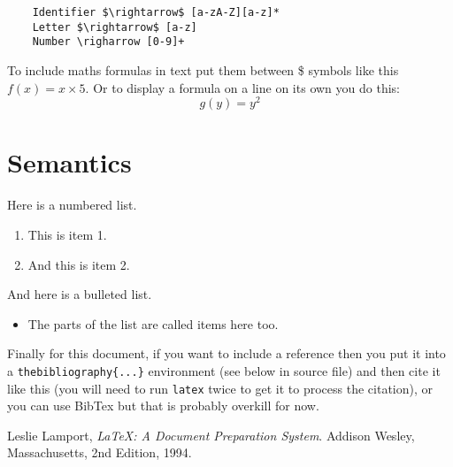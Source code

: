 \documentclass[a4wide, 11pt]{article}
\begin{document}
\begin{verbatim}
	Identifier $\rightarrow$ [a-zA-Z][a-z]*
	Letter $\rightarrow$ [a-z]
	Number \righarrow [0-9]+
\end{verbatim}

To include maths formulas in text put them between \$ symbols like this
$f(x) = x \times 5$.
Or to display a formula on a line on its own you do this:
\[
    g(y) = y^2
\]

\section{Semantics}

Here is a numbered list.

\begin{enumerate}

    \item
    This is item 1.
    
    \item
    And this is item 2.
    
\end{enumerate}

And here is a bulleted list.

\begin{itemize}

    \item
    The parts of the list are called items here too.
    
\end{itemize}

Finally for this document, if you want to include a reference
then you put it into a \texttt{thebibliography\{...\}}
environment (see below in source file) and then 
cite it like this \cite{lamport94}
(you will need to run \texttt{latex} twice to get it to process the citation),
or you can use BibTex but that is probably overkill for now.

\begin{thebibliography}{9}

  Leslie Lamport,
  \emph{\LaTeX: A Document Preparation System}.
  Addison Wesley, Massachusetts,
  2nd Edition,
  1994.

\end{thebibliography}
\end{document}
